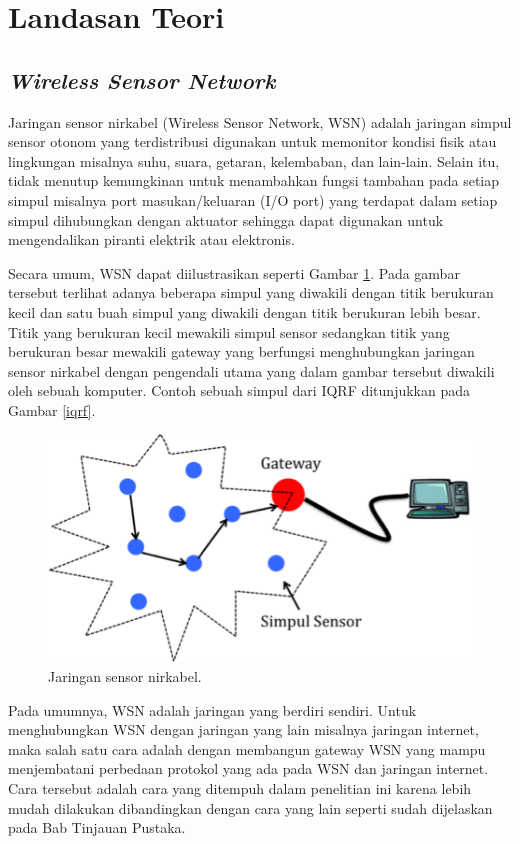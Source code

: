 \section{Landasan Teori}
  \subsection{\emph{Wireless Sensor Network}}
    Jaringan sensor nirkabel (Wireless Sensor Network, WSN) adalah jaringan simpul sensor otonom yang terdistribusi digunakan untuk memonitor kondisi fisik atau lingkungan misalnya suhu, suara, getaran, kelembaban, dan lain-lain. Selain itu, tidak menutup kemungkinan untuk menambahkan fungsi tambahan pada setiap simpul misalnya port masukan/keluaran (I/O port) yang terdapat dalam setiap simpul dihubungkan dengan aktuator sehingga dapat digunakan untuk mengendalikan piranti elektrik atau elektronis.

    Secara umum, WSN dapat diilustrasikan seperti Gambar \ref{wsn}. Pada gambar tersebut terlihat adanya beberapa simpul yang diwakili dengan titik berukuran kecil dan satu buah simpul yang diwakili dengan titik berukuran lebih besar. Titik yang berukuran kecil mewakili simpul sensor sedangkan titik yang berukuran besar mewakili gateway yang berfungsi menghubungkan jaringan sensor nirkabel dengan pengendali utama yang dalam gambar tersebut diwakili oleh sebuah komputer. Contoh sebuah simpul dari IQRF ditunjukkan pada Gambar \ref{iqrf}.

      \begin{figure}[ht!]
        \centering
          \includegraphics{gambar/wsn}
          \caption{Jaringan sensor nirkabel.}
          \label{wsn}
      \end{figure}

    Pada umumnya, WSN adalah jaringan yang berdiri sendiri. Untuk menghubungkan WSN dengan jaringan yang lain misalnya jaringan internet, maka salah satu cara adalah dengan membangun gateway WSN yang mampu menjembatani perbedaan protokol yang ada pada WSN dan jaringan internet. Cara tersebut adalah cara yang ditempuh dalam penelitian ini karena lebih mudah dilakukan dibandingkan dengan cara yang lain seperti sudah dijelaskan pada Bab Tinjauan Pustaka.

